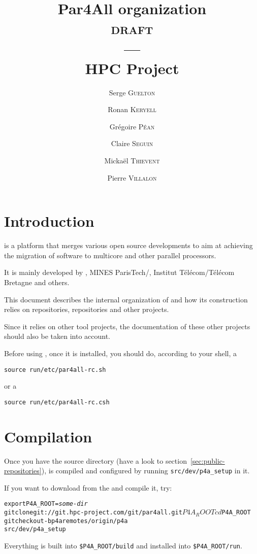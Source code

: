 \documentclass[a4paper]{article}
\begin{document}
\title{Par4All organization\\
  \textsc{draft}\\
  ---\\
  HPC Project}

\author{Serge \textsc{Guelton} \and Ronan \textsc{Keryell} \and Grégoire
  \textsc{Péan} \and Claire \textsc{Seguin} \and Mickaël \textsc{Thievent}
  \and Pierre \textsc{Villalon}}

\maketitle

\tableofcontents{}

\section{Introduction}
\label{sec:introduction}

\Apfa is a platform that merges various open source developments
to aim at achieving the migration of software to multicore and other
parallel processors.

It is mainly developed by \Ahpcp, MINES ParisTech/\Acri, Institut
Télécom/Télécom Bretagne and others.

This document describes the internal organization of \Apfa and how its
construction relies on \Agit repositories, \Asvn repositories and other
projects.

Since it relies on other tool projects, the documentation of these other
projects should also be taken into account.

Before using \Apips, once it is installed, you should do, according to your
shell, a
\begin{verbatim}
source run/etc/par4all-rc.sh
\end{verbatim}
or a
\begin{verbatim}
source run/etc/par4all-rc.csh
\end{verbatim}


\section{Compilation}
\label{sec:compilation}

Once you have the \Apfa source directory (have a look to
section~\ref{sec:public-repositories}), \Apfa is compiled and configured
by running \verb|src/dev/p4a_setup| in it.

If you want to download \Apfa from the \Agit and compile it, try:
\begin{alltt}
  export P4A_ROOT=\emph{some-dir}
  git clone git://git.hpc-project.com/git/par4all.git $P4A_ROOT
  cd $P4A_ROOT
  git checkout -b p4a remotes/origin/p4a
  src/dev/p4a_setup
\end{alltt}%
Everything is built into \verb|$P4A_ROOT/build| and installed into
\verb|$P4A_ROOT/run|.
\end{document}
